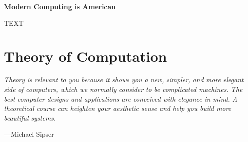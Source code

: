 \begin{tcolorbox}[breakable, enhanced, colback=textbook-blue, sharp corners]
	\vspace{3mm}
	\begin{center}
		\textbf{Modern Computing is American}
	\end{center}
	TEXT
	\vspace{3mm}
\end{tcolorbox}
\vspace{2\baselineskip}


\newpage


\part*{Theory of Computation}

\vspace{\baselineskip}
\begin{displayquote}
	\textit{Theory is relevant to you because it shows you a new, simpler, and more elegant side of computers, which we normally consider to be complicated machines. The best computer designs and applications are conceived with elegance in mind. A theoretical course can heighten your aesthetic sense and help you build more beautiful systems.}
	\begin{flushright}
		---Michael Sipser
	\end{flushright}
\end{displayquote}
\vspace{4mm}


